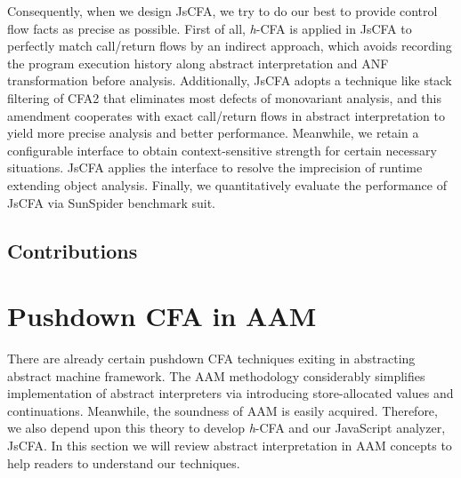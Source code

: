 \documentclass{article}
\begin{document}
Consequently, when we design JsCFA, we try to do our best to provide control flow facts as precise as possible.
First of all, \textit{h}-CFA is applied in JsCFA to perfectly match call/return flows by an indirect approach, which avoids recording the program execution history along abstract interpretation and ANF transformation before analysis.
Additionally, JsCFA adopts a technique like stack filtering of CFA2 that eliminates most defects of monovariant analysis, and this amendment cooperates with exact call/return flows in abstract interpretation to yield more precise analysis and better performance.
Meanwhile, we retain a configurable interface to obtain context-sensitive strength for certain necessary situations.
JsCFA applies the interface to resolve the imprecision of runtime extending object analysis. Finally, we quantitatively evaluate the performance of JsCFA via SunSpider benchmark suit. %

\subsection{Contributions}
\label{sub:Contributions}

\section{Pushdown CFA in AAM}
\label{sec:PushdownAAM}
There are already certain pushdown CFA techniques exiting in abstracting abstract machine %
framework.
The AAM methodology considerably simplifies implementation of abstract interpreters via introducing store-allocated values and continuations.
Meanwhile, the soundness of AAM is easily acquired.
Therefore, we also depend upon this theory to develop \textit{h}-CFA and our JavaScript analyzer, JsCFA\@.
In this section we will review abstract interpretation in AAM concepts to help readers to understand our techniques.
\end{document}
